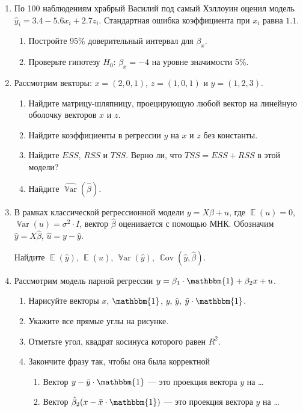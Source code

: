 \documentclass[12pt, a4paper]{article}
\DeclareMathOperator{\E}{\mathbb{E}}
\DeclareMathOperator{\Var}{\mathbb{V}ar}
\DeclareMathOperator{\Cov}{\mathbb{C}ov}
\def \hb{\hat{\beta}}
\def \1{\mathbbm{1}}
\def \hy{\hat{y}}
\def \hVar{\widehat{\Var}}
\begin{document}
\begin{enumerate}

\item По 100 наблюдениям храбрый Василий под самый Хэллоуин оценил модель $\hy_i = 3.4 - 5.6 x_i + 2.7 z_i$. Стандартная ошибка коэффициента при $x_i$ равна $1.1$.

  \begin{enumerate}
    \item Постройте 95\% доверительный интервал для $\beta_x$.
    \item Проверьте гипотезу $H_0$: $\beta_x = -4$ на уровне значимости 5\%.
  \end{enumerate}

\item Рассмотрим векторы: $x = (2, 0, 1)$, $z = (1, 0, 1)$ и $y= (1, 2, 3)$.
\begin{enumerate}
  \item Найдите матрицу-шляпницу, проецирующую любой вектор на линейную оболочку векторов $x$ и $z$.
  \item Найдите коэффициенты в регрессии $y$ на $x$ и $z$ без константы.
  \item Найдите $ESS$, $RSS$ и $TSS$. Верно ли, что $TSS=ESS+RSS$ в этой модели?
  \item Найдите $\hVar(\hb)$.
\end{enumerate}



\item В рамках классической регрессионной модели $y=X\beta + u$, где $\E(u)=0$, $\Var(u)=\sigma^2 \cdot I$, вектор $\hb$ оценивается с помощью МНК. Обозначим $\hy=X\hb$, $\hat{u}=y-\hy$.

Найдите $\E(\hy)$, $\E(\hat{u})$, $\Var(\hy)$, $\Cov(\hy, \hb)$.

\item Рассмотрим модель парной регрессии $y = \beta_1 \cdot \1 + \beta_2 x + u$.

\begin{enumerate}
  \item Нарисуйте векторы $x$, $\1$, $y$, $\hy$, $\bar y \cdot \1$.
  \item Укажите все прямые углы на рисунке.
  \item Отметьте угол, квадрат косинуса которого равен $R^2$.
  \item Закончите фразу так, чтобы она была корректной
  \begin{enumerate}
    \item Вектор $y - \bar{y}\cdot \1$ — это проекция вектора $y$ на \ldots
    \item Вектор $\hb_2 (x - \bar x\cdot \1)$ — это проекция вектора $y$ на \ldots
  \end{enumerate}
\end{enumerate}


\end{enumerate}
\end{document}
